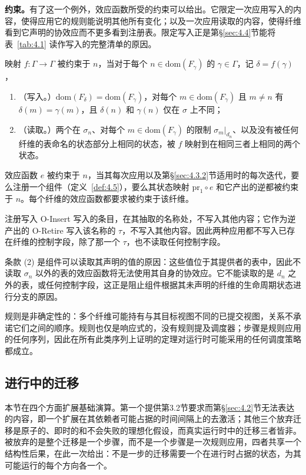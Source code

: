 \textbf{约束。}有了这一个例外，效应函数所受的约束可以给出。它限定一次应用写入的内容，使得应用它的规则能说明其他所有变化；以及一次应用读取的内容，使得纤维看到它声明的协效应而不更多看到注册表。限定写入正是第\S\ref{sec:4.4}节能将表~\ref{tab:4.1} 读作写入的完整清单的原因。

\begin{definition}\label{def:4.6}
映射 $f: \Gamma \to \Gamma$ 被约束于 $n$，当对于每个 $n \in \mathrm{dom}(F_\gamma)$ 的 $\gamma \in \Gamma$，记 $\delta = f(\gamma)$，
\begin{enumerate}
\item （写入。）$\mathrm{dom}(F_\delta) = \mathrm{dom}(F_\gamma)$，对每个 $m \in \mathrm{dom}(F_\gamma)$ 且 $m \neq n$ 有 $\delta(m) = \gamma(m)$，且 $\delta(n)$ 和 $\gamma(n)$ 仅在 $\sigma$ 上不同；
\item （读取。）两个在 $\sigma_n$、对每个 $m \in \mathrm{dom}(F_\gamma)$ 的限制 $\sigma_m|_{d_n}$、以及没有被任何纤维的表命名的状态部分上相同的状态，被 $f$ 映射到在相同三者上相同的两个状态。
\end{enumerate}
效应函数 $e$ 被约束于 $n$，当其每次应用以及第\S\ref{sec:4.3.2}节适用时的每次迭代，要么注册一个组件（定义~\ref{def:4.5}），要么其状态映射 $\mathrm{pr}_1 \circ e$ 和它产出的逆都被约束于 $n$。每个纤维的效应函数都要求被约束于该纤维。
\end{definition}

注册写入 O-Insert 写入的条目，在其抽取的名称处，不写入其他内容；它作为逆产出的 O-Retire 写入该名称的 $\tau$，不写入其他内容。因此两种应用都不写入已存在纤维的控制字段，除了那一个 $\tau$，也不读取任何控制字段。

条款 (2) 是组件可以读取其声明的值的原因：这些值位于其提供者的表中，因此不读取 $\sigma_n$ 以外的表的效应函数将无法使用其自身的协效应。它不能读取的是 $d_n$ 之外的表，或任何控制字段，这正是阻止组件根据其未声明的纤维的生命周期状态进行分支的原因。

规则是非确定性的：多个纤维可能持有与其目标视图不同的已提交视图，关系不承诺它们之间的顺序。规则也仅是响应式的，没有规则提及调度器；步骤是规则应用的任何序列，因此在所有此类序列上证明的定理对运行时可能采用的任何调度策略都成立。

\subsection{进行中的迁移}\label{sec:4.3}

本节在四个方面扩展基础演算。第一个提供第3.2节要求而第\S\ref{sec:4.2}节无法表达的内容，即一个扩展在其依赖者可能占据的时间间隔上的去激活；其他三个放弃迁移是原子的、即时的和不会失败的理想化假设，而真实运行时中的迁移三者皆非。被放弃的是整个迁移是一个步骤，而不是一个步骤是一次规则应用，四者共享一个结构性后果，在此一次给出：不是一步的迁移需要一个在进行时占据的状态，为其可能运行的每个方向各一个。

